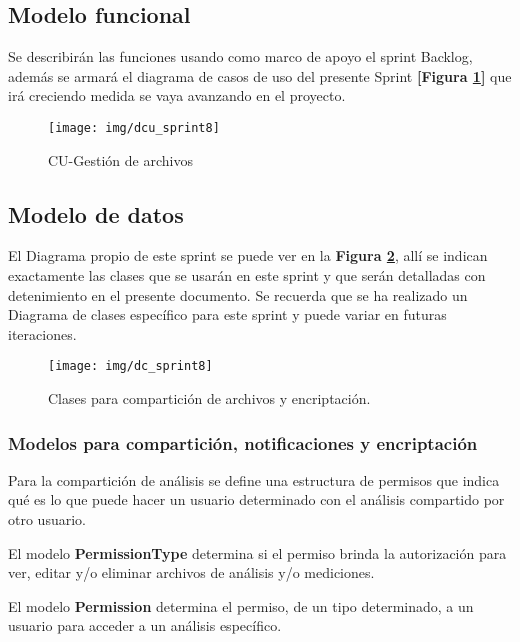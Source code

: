 \subsection{Modelo funcional} 
Se describirán las funciones usando como marco de apoyo el sprint Backlog, además se armará el diagrama de casos de uso del presente Sprint \textbf{[Figura \ref{8-cu_compartición_encriptación}]} que irá creciendo  medida se vaya avanzando en el proyecto.

    \begin{figure}[h]
        \centering
        \texttt{[image: img/dcu\_sprint8]}
        \caption{CU-Gestión de archivos}
		\label{8-cu_compartición_encriptación}
    \end{figure}


\subsection{Modelo de datos}
El Diagrama propio de este sprint se puede ver en la \textbf{Figura \ref{8-clases_compartición_encriptación}}, allí se indican exactamente las clases que se usarán en este sprint y que serán detalladas con detenimiento en el presente documento. Se recuerda que se ha realizado un Diagrama de clases específico para este sprint y puede variar en futuras iteraciones.

    \begin{figure}[h]
        \centering
        \texttt{[image: img/dc\_sprint8]}
        \caption{Clases para compartición de archivos y encriptación.}
		\label{8-clases_compartición_encriptación}
    \end{figure}

\subsubsection{Modelos para compartición, notificaciones y encriptación}

Para la compartición de análisis se define una estructura de permisos que indica qué es lo que puede hacer un usuario determinado con el análisis compartido por otro usuario.

El modelo \textbf{PermissionType} determina si el permiso brinda la autorización para ver, editar y/o eliminar archivos de análisis y/o mediciones.

El modelo \textbf{Permission} determina el permiso, de un tipo determinado, a un usuario para acceder a un análisis específico.

